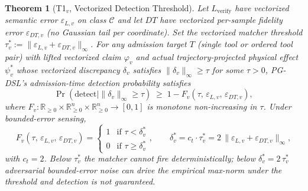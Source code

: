 \documentclass[11pt]{article}
\newtheorem{theorem}{Theorem}
\begin{document}
\begin{theorem}[T1${}_v$, Vectorized Detection Threshold]
\label{thm:t1v}
Let $L_{\text{verify}}$ have vectorized semantic error $\varepsilon_{L,v}$ on
class $\mathcal{C}$ and let $\mathit{DT}$ have vectorized per-sample fidelity
error $\varepsilon_{DT,v}$ (no Gaussian tail per coordinate). Set the
vectorized matcher threshold $\tau^{*}_{v} := \|\varepsilon_{L,v} +
\varepsilon_{DT,v}\|_\infty$. For any admission target $T$ (single tool or
ordered tool pair) with lifted vectorized claim $\varphi_v$ and actual
trajectory-projected physical effect $\psi_v^{*}$ whose vectorized
discrepancy $\delta_v$ satisfies $\|\delta_v\|_\infty \geq \tau$ for some
$\tau > 0$, PG-DSL's admission-time detection probability satisfies
\[
\Pr(\text{detect} \mid \|\delta_v\|_\infty \geq \tau)
   \;\geq\;
1 - F_v(\tau,\, \varepsilon_{L,v},\, \varepsilon_{DT,v}),
\]
where $F_v: \mathbb{R}_{\geq 0} \times \mathbb{R}_{\geq 0}^{n} \times
\mathbb{R}_{\geq 0}^{n} \to [0, 1]$ is monotone non-increasing in $\tau$.
Under bounded-error sensing,
\[
F_v(\tau,\,\varepsilon_{L,v},\,\varepsilon_{DT,v}) =
\begin{cases}
1 & \text{if } \tau < \delta^{*}_{v} \\
0 & \text{if } \tau \geq \delta^{*}_{v}
\end{cases},
\qquad \delta^{*}_{v} = c_t \cdot \tau^{*}_{v} = 2\,\|\varepsilon_{L,v} + \varepsilon_{DT,v}\|_\infty,
\]
with $c_t = 2$. Below $\tau^{*}_{v}$ the matcher cannot fire deterministically;
below $\delta^{*}_{v} = 2\,\tau^{*}_{v}$ adversarial bounded-error noise can
drive the empirical max-norm under the threshold and detection is not
guaranteed.
\end{theorem}
\end{document}
